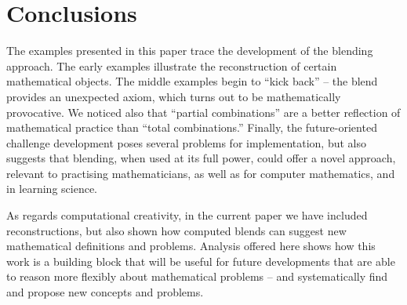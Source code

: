 \section{Conclusions}
\label{sec:conc}

The examples presented in this paper trace the development of the
blending approach.  The early examples illustrate the reconstruction
of certain mathematical objects.  The middle examples begin to ``kick
back'' -- the blend provides an unexpected axiom, which turns out to
be mathematically provocative.  We noticed also that ``partial
combinations'' are a better reflection of mathematical practice than
``total combinations.''  Finally, the future-oriented challenge
development poses several problems for implementation, but also
suggests that blending, when used at its full power, could offer a
novel approach, relevant to practising mathematicians,
as well as for computer mathematics, and in learning science.

As regards computational creativity, in the current paper we have
included reconstructions, but also shown how computed blends can suggest
new mathematical definitions and problems.  Analysis offered here
shows how this work is a building block that will be useful for future
developments that are able to reason more flexibly about mathematical
problems -- and systematically find and propose  new concepts and problems.


